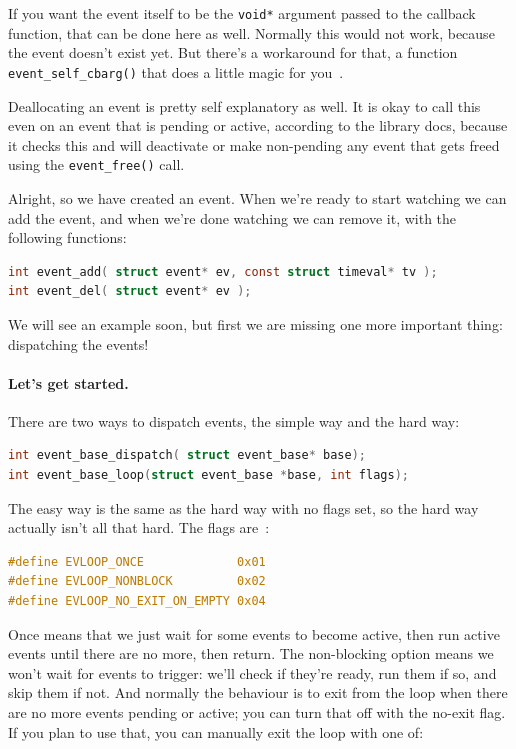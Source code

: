 If you want the event itself to be the \texttt{void*} argument passed to the callback function, that can be done here as well. Normally this would not work, because the event doesn't exist yet. But there's a workaround for that, a function \texttt{event\_self\_cbarg()} that does a little magic for you~\cite{libevent}.

Deallocating an event is pretty self explanatory as well. It is okay to call this even on an event that is pending or active, according to the library docs, because it checks this and will deactivate or make non-pending any event that gets freed using the \texttt{event\_free()} call.

Alright, so we have created an event. When we're ready to start watching we can add the event, and when we're done watching we can remove it, with the following functions:
\begin{lstlisting}[language=C]
int event_add( struct event* ev, const struct timeval* tv );
int event_del( struct event* ev );
\end{lstlisting}

We will see an example soon, but first we are missing one more important thing: dispatching the events!

\paragraph{Let's get started.}
There are two ways to dispatch events, the simple way and the hard way:
\begin{lstlisting}[language=C]
int event_base_dispatch( struct event_base* base);
int event_base_loop(struct event_base *base, int flags);
\end{lstlisting}

The easy way is the same as the hard way with no flags set, so the hard way actually isn't all that hard. The flags are~\cite{libevent}:
\begin{lstlisting}[language=C]
#define EVLOOP_ONCE             0x01
#define EVLOOP_NONBLOCK         0x02
#define EVLOOP_NO_EXIT_ON_EMPTY 0x04
\end{lstlisting}

Once means that we just wait for some events to become active, then run active events until there are no more, then return. The non-blocking option means we won't wait for events to trigger: we'll check if they're ready, run them if so, and skip them if not. And normally the behaviour is to exit from the loop when there are no more events pending or active; you can turn that off with the no-exit flag. If you plan to use that, you can manually exit the loop with one of:

